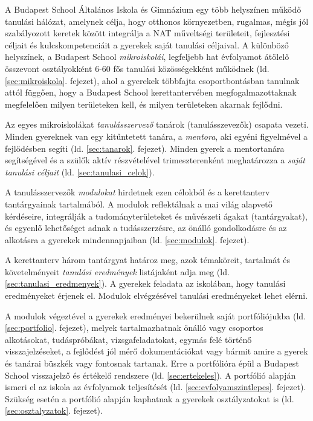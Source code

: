A Budapest School Általános Iskola és Gimnázium egy több helyszínen működő
tanulási hálózat, amelynek célja, hogy otthonos környezetben, rugalmas, mégis
jól szabályozott keretek között integrálja a NAT
műveltségi
területeit, fejlesztési céljait és kulcskompetenciáit a gyerekek saját tanulási
céljaival. A különböző helyszínek, a Budapest
School \emph{mikroiskolái}, legfeljebb hat évfolyamot átölelő összevont
osztályokként
6-60 fős tanulási közösségekként működnek (ld. \ref{sec:mikroiskola}. fejezet),
ahol a gyerekek többfajta
csoportbontásban tanulnak attól függően, hogy a Budapest School
kerettantervében megfogalmazottaknak megfelelően milyen területeken kell, és
milyen területeken akarnak fejlődni.

Az egyes mikroiskolákat \emph{tanulásszervező} tanárok (tanulásszevezők)
csapata
vezeti.
Minden gyereknek van egy kitűntetett tanára, a \emph{mentora},
aki egyéni figyelmével a fejlődésben segíti
(ld. \ref{sec:tanarok}. fejezet).
Minden gyerek a mentortanára segítségével és a szülők aktív
részvételével trimeszterenként meghatározza a \emph{saját tanulási céljait}
(ld.
\ref{sec:tanulasi_celok}).

A tanulásszervezők \emph{modulokat} hirdetnek ezen célokból és a kerettanterv
tantárgyainak tartalmából. A modulok reflektálnak a
mai világ alapvető kérdéseire,
integrálják	a tudományterületeket és művészeti ágakat (tantárgyakat),
és egyenlő lehetőséget adnak a tudásszerzésre, az önálló gondolkodásre és az
alkotásra a gyerekek mindennapjaiban (ld. \ref{sec:modulok}. fejezet).

A kerettanterv három tantárgyat határoz meg, azok
témaköreit, tartalmát és követelményeit \emph{tanulási eredmények}
listájaként adja meg (ld. \ref{sec:tanulasi_eredmenyek}). A gyerekek feladata
az iskolában, hogy tanulási eredményeket
érjenek el. Modulok elvégzésével tanulási eredményeket lehet
elérni.

A modulok végeztével a gyerekek eredményei bekerülnek saját portfóliójukba (ld.
\ref{sec:portfolio}. fejezet),
melyek tartalmazhatnak önálló vagy csoportos alkotásokat, tudáspróbákat, vizsgafeladatokat,
egymás felé történő visszajelzéseket, a fejlődést jól mérő dokumentációkat vagy
bármit amire a gyerek és tanárai büszkék vagy fontosnak tartanak.
Erre a portfólióra épül a Budapest School visszajelző és értékelő rendszere
(ld. \ref{sec:ertekeles}). A
portfólió alapján ismeri el az iskola az évfolyamok teljesítését (ld. \ref{sec:evfolyamszintlepes}. fejezet). Szükség
esetén a portfólió alapján kaphatnak a gyerekek osztályzatokat is (ld. \ref{sec:osztalyzatok}. fejezet).

